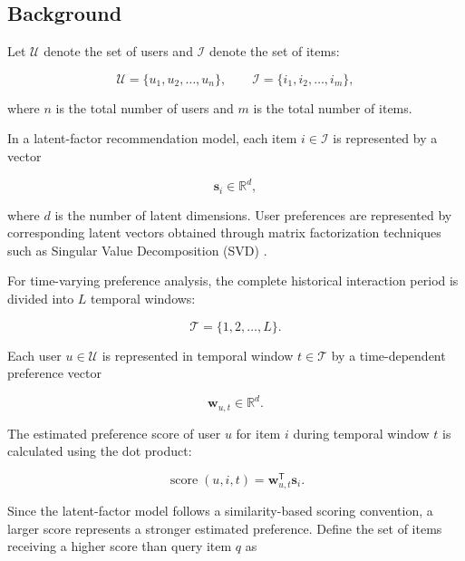 \subsection{Background}
\label{subsec:background}

Let $\mathcal{U}$ denote the set of users and $\mathcal{I}$ denote the set of items:

\begin{equation}
\mathcal{U}=\{u_1,u_2,\ldots,u_n\},
\qquad
\mathcal{I}=\{i_1,i_2,\ldots,i_m\},
\label{eq:user_item_sets}
\end{equation}

where $n$ is the total number of users and $m$ is the total number of items.

In a latent-factor recommendation model, each item $i\in\mathcal{I}$ is represented by a vector

\begin{equation}
\mathbf{s}_i\in\mathbb{R}^{d},
\label{eq:item_vector}
\end{equation}

where $d$ is the number of latent dimensions. User preferences are represented by corresponding latent vectors obtained through matrix factorization techniques such as Singular Value Decomposition (SVD) \cite{matrix_factorization}.

For time-varying preference analysis, the complete historical interaction period is divided into $L$ temporal windows:

\begin{equation}
\mathcal{T}=\{1,2,\ldots,L\}.
\label{eq:temporal_window_set}
\end{equation}

Each user $u\in\mathcal{U}$ is represented in temporal window $t\in\mathcal{T}$ by a time-dependent preference vector

\begin{equation}
\mathbf{w}_{u,t}\in\mathbb{R}^{d}.
\label{eq:temporal_user_vector}
\end{equation}

The estimated preference score of user $u$ for item $i$ during temporal window $t$ is calculated using the dot product:

\begin{equation}
\operatorname{score}(u,i,t)
=
\mathbf{w}_{u,t}^{\mathsf{T}}\mathbf{s}_i.
\label{eq:preference_score}
\end{equation}

Since the latent-factor model follows a similarity-based scoring convention, a larger score represents a stronger estimated preference. Define the set of items receiving a higher score than query item $q$ as

